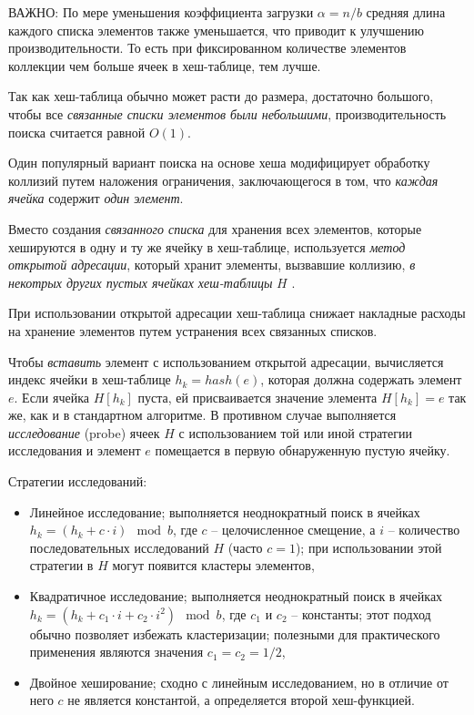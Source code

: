 \documentclass[%
	11pt,
	a4paper,
	utf8,
		]{article}
\begin{document}
ВАЖНО: По мере уменьшения коэффициента загрузки $ \alpha = n/b $ средняя длина каждого списка элементов также уменьшается, что приводит к улучшению производительности. То есть при фиксированном количестве элементов коллекции чем больше ячеек в хеш-таблице, тем лучше.

Так как хеш-таблица обычно может расти до размера, достаточно большого, чтобы все \emph{связанные списки элементов были небольшими}, производительность поиска считается равной $ O(1) $.

Один популярный вариант поиска на основе хеша модифицирует обработку коллизий путем наложения ограничения, заключающегося в том, что \emph{каждая ячейка} содержит \emph{один элемент}.

Вместо создания \emph{связанного списка} для хранения всех элементов, которые хешируются в одну и ту же ячейку в хеш-таблице, используется \emph{метод открытой адресации}, который хранит элементы, вызвавшие коллизию, \emph{в некотрых других пустых ячейках хеш-таблицы} $ H $ \cite[140]{heineman:2017}.

При использовании открытой адресации хеш-таблица снижает накладные расходы на хранение элементов путем устранения всех связанных списков.

Чтобы \emph{вставить} элемент с использованием открытой адресации, вычисляется индекс ячейки в хеш-таблице $ h_k = hash(e) $, которая должна содержать элемент $ e $. Если ячейка $ H[h_k] $ пуста, ей присваивается значение элемента $ H[h_k] = e $ так же, как и в стандартном алгоритме. В противном случае выполняется \emph{исследование} (probe) ячеек $ H $ с использованием той или иной стратегии исследования и элемент $ e $ помещается в первую обнаруженную пустую ячейку.

Стратегии исследований:
\begin{itemize}
	\item Линейное исследование; выполняется неоднократный поиск в ячейках $ h_k = (h_k + c\cdot i) \mod b $, где $ c $ -- целочисленное смещение, а $ i $ -- количество последовательных исследований $ H $ (часто $ c = 1 $); при использовании этой стратегии в $ H $ могут появится кластеры элементов,
	
	\item Квадратичное исследование; выполняется неоднократный поиск в ячейках $ h_k = (h_k + c_1 \cdot i + c_2 \cdot i^2) \mod b $, где $ c_1 $ и $ c_2 $ -- константы; этот подход обычно позволяет избежать кластеризации; полезными для практического применения являются значения $ c_1 = c_2 = 1/2 $,
	
	\item Двойное хеширование; сходно с линейным исследованием, но в отличие от него $ c $ не является константой, а определяется второй хеш-функцией.
\end{itemize}
\end{document}
